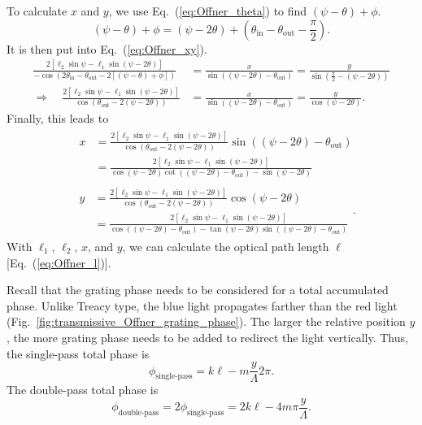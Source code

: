 \documentclass[12pt,hidelinks]{book}
\begin{document}
To calculate $x$ and $y$, we use Eq.~(\ref{eq:Offner_theta}) to find $\left(\psi-\theta\right)+\phi$.
\begin{equation}
\left(\psi-\theta\right)+\phi=\left(\psi-2\theta\right)+\left(\theta_{\text{in}}-\theta_{\text{out}}-\frac{\pi}{2}\right).
\end{equation}
It is then put into Eq.~(\ref{eq:Offner_xy}).
\begin{align}
\frac{2\left[\ell_2\sin\psi-\ell_1\sin(\psi-2\theta)\right]}{-\cos(2\theta_{\text{in}}-\theta_{\text{out}}-2\left[\left(\psi-\theta\right)+\phi\right])} & =\frac{x}{\sin(\left(\psi-2\theta\right)-\theta_{\text{out}})}=\frac{y}{\sin(\frac{\pi}{2}-\left(\psi-2\theta\right))} \nonumber \\
\Rightarrow\quad\frac{2\left[\ell_2\sin\psi-\ell_1\sin(\psi-2\theta)\right]}{\cos(\theta_{\text{out}}-2\left(\psi-2\theta\right))} & =\frac{x}{\sin(\left(\psi-2\theta\right)-\theta_{\text{out}})}=\frac{y}{\cos(\psi-2\theta)}.
\end{align}
Finally, this leads to
\begin{subequations}
\begin{align}
& \begin{aligned}
x & =\frac{2\left[\ell_2\sin\psi-\ell_1\sin(\psi-2\theta)\right]}{\cos(\theta_{\text{out}}-2\left(\psi-2\theta\right))}\sin(\left(\psi-2\theta\right)-\theta_{\text{out}}) \\
& =\frac{2\left[\ell_2\sin\psi-\ell_1\sin(\psi-2\theta)\right]}{\cos(\psi-2\theta)\cot(\left(\psi-2\theta\right)-\theta_{\text{out}})-\sin(\psi-2\theta)}
\end{aligned} \\
& \begin{aligned}
y & =\frac{2\left[\ell_2\sin\psi-\ell_1\sin(\psi-2\theta)\right]}{\cos(\theta_{\text{out}}-2\left(\psi-2\theta\right))}\cos(\psi-2\theta) \\
& =\frac{2\left[\ell_2\sin\psi-\ell_1\sin(\psi-2\theta)\right]}{\cos(\left(\psi-2\theta\right)-\theta_{\text{out}})-\tan(\psi-2\theta)\sin(\left(\psi-2\theta\right)-\theta_{\text{out}})}
\end{aligned}.
\end{align}
\end{subequations}
With $\ell_1$, $\ell_2$, $x$, and $y$, we can calculate the optical path length $\ell$ [Eq.~(\ref{eq:Offner_l})].

Recall that the grating phase needs to be considered for a total accumulated phase. Unlike Treacy type, the blue light propagates farther than the red light (Fig.~\ref{fig:transmissive_Offner_grating_phase}). The larger the relative position $y$, the more grating phase needs to be added to redirect the light vertically. Thus, the single-pass total phase is
\begin{equation}
\phi_{\text{single-pass}}=k\ell-m\frac{y}{\Lambda}2\pi.
\end{equation}
The double-pass total phase is
\begin{equation}
\phi_{\text{double-pass}}=2\phi_{\text{single-pass}}=2k\ell-4m\pi\frac{y}{\Lambda}.
\end{equation}
\end{document}
